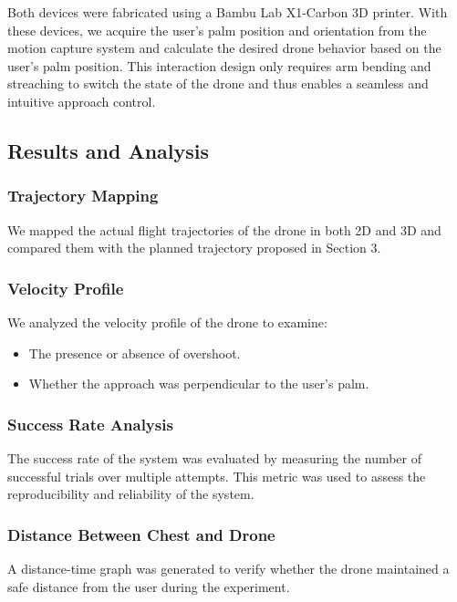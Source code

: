Both devices were fabricated using a Bambu Lab X1-Carbon 3D printer. 
With these devices, we acquire the user's palm position and orientation from the motion capture system and calculate the desired drone behavior based on the user's palm position. 
This interaction design only requires arm bending and streaching to switch the state of the drone and thus enables a seamless and intuitive approach control.

\subsection{Results and Analysis}

\subsubsection{Trajectory Mapping}
We mapped the actual flight trajectories of the drone in both 2D and 3D and compared them with the planned trajectory proposed in Section 3.

\subsubsection{Velocity Profile}
We analyzed the velocity profile of the drone to examine:
\begin{itemize}
    \item The presence or absence of overshoot.
    \item Whether the approach was perpendicular to the user's palm.
\end{itemize}

\subsubsection{Success Rate Analysis}
The success rate of the system was evaluated by measuring the number of successful trials over multiple attempts. This metric was used to assess the reproducibility and reliability of the system.

\subsubsection{Distance Between Chest and Drone}
A distance-time graph was generated to verify whether the drone maintained a safe distance from the user during the experiment.

